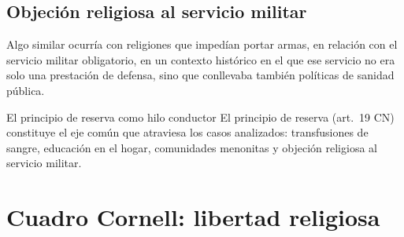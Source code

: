 \documentclass[12pt,oneside]{book}
\begin{document}
\subsection{Objeción religiosa al servicio militar}

Algo similar ocurría con religiones que impedían portar armas, en relación con el servicio militar obligatorio, en un contexto histórico en el que ese servicio no era solo una prestación de defensa, sino que conllevaba también políticas de sanidad pública.

\begin{definition}{El principio de reserva como hilo conductor}
El principio de reserva (art.\ 19 CN) constituye el eje común que atraviesa los casos analizados: transfusiones de sangre, educación en el hogar, comunidades menonitas y objeción religiosa al servicio militar.
\end{definition}

\section{Cuadro Cornell: libertad religiosa}
\end{document}
